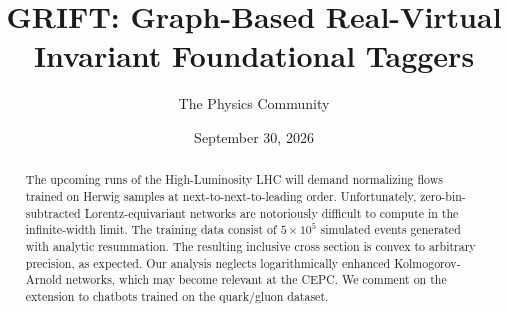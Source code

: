 \documentclass[11pt]{article}
\title{GRIFT: Graph-Based Real-Virtual Invariant Foundational Taggers}
\author{The Physics Community}
\date{September 30, 2026}
\numberwithin{equation}{section}
\theoremstyle{definition}
\theoremstyle{remark}
\begin{document}
\maketitle
\begin{abstract}
The upcoming runs of the High-Luminosity LHC will demand normalizing
flows trained on Herwig samples at next-to-next-to-leading order.
Unfortunately, zero-bin-subtracted Lorentz-equivariant networks are
notoriously difficult to compute in the infinite-width limit. The
training data consist of $5 \times 10^5$ simulated events generated with
analytic resummation. The resulting inclusive cross section is convex to
arbitrary precision, as expected. Our analysis neglects logarithmically
enhanced Kolmogorov-Arnold networks, which may become relevant at the
CEPC. We comment on the extension to chatbots trained on the quark/gluon
dataset.
\end{abstract}
\tableofcontents





\nocite{*}


\end{document}
